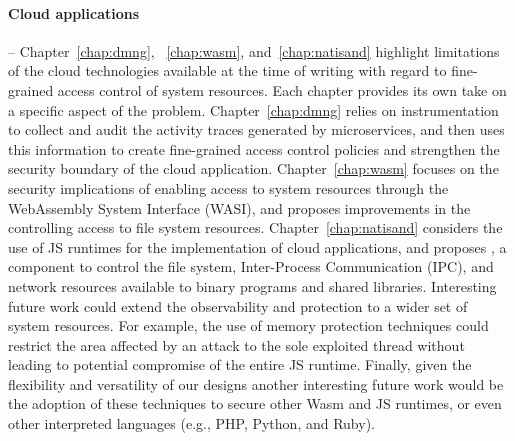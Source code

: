 \paragraph*{Cloud applications} -- Chapter~\ref{chap:dmng},
~\ref{chap:wasm}, and~\ref{chap:natisand} highlight limitations of the
cloud technologies available at the time of writing with regard to
fine-grained access control of system resources. Each chapter provides
its own take on a specific aspect of the problem.
Chapter~\ref{chap:dmng} relies on instrumentation to collect and audit
the activity traces generated by microservices, and then uses this
information to create fine-grained access control policies and
strengthen the security boundary of the cloud application.
Chapter~\ref{chap:wasm} focuses on the security implications of
enabling access to system resources through the WebAssembly System
Interface (WASI), and proposes improvements in the controlling access
to file system resources. Chapter~\ref{chap:natisand} considers the
use of JS runtimes for the implementation of cloud applications, and
proposes \natisand, a component to control the file system,
Inter-Process Communication (IPC), and network resources available to
binary programs and shared libraries. Interesting future work could
extend the observability and protection to a wider set of system
resources. For example, the use of memory protection techniques could
restrict the area affected by an attack to the sole exploited thread
without leading to potential compromise of the entire JS runtime.
Finally, given the flexibility and versatility of our designs another
interesting future work would be the adoption of these techniques to
secure other Wasm and JS runtimes, or even other interpreted languages
(e.g., PHP, Python, and Ruby).
